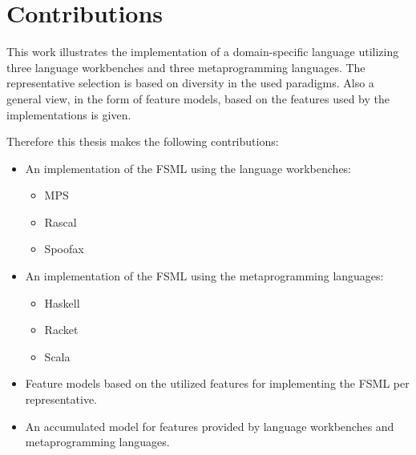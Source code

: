 \section{Contributions}

This work illustrates the implementation of a domain-specific language utilizing three language workbenches and three metaprogramming languages.
The representative selection is based on diversity in the used paradigms.
Also a general view, in the form of feature models, based on the features used by the implementations is given.

Therefore this thesis makes the following contributions:

\begin{itemize}
	\item An implementation of the FSML using the language workbenches:
	\begin{itemize}
		\item MPS
		\item Rascal
		\item Spoofax
	\end{itemize}
	\item An implementation of the FSML using the metaprogramming languages:
	\begin{itemize}
		\item Haskell
		\item Racket
		\item Scala
	\end{itemize}
	\item Feature models based on the utilized features for implementing the FSML per representative.
	\item An accumulated model for features provided by language workbenches and metaprogramming languages. 
\end{itemize}

